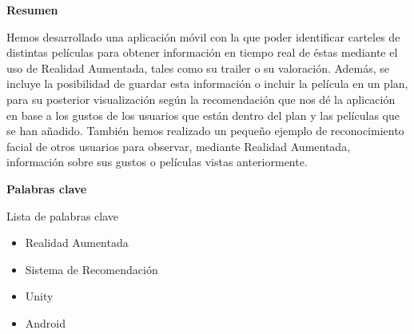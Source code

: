 
\newpage

\thispagestyle{empty}

\begin{center}

{\bf \Huge Resumen}

  \end{center}
\vspace{1cm}

Hemos desarrollado una aplicación móvil con la que poder identificar
carteles de distintas películas para obtener información en tiempo real de
éstas mediante el uso de Realidad Aumentada, tales como su trailer o su valoración. Además,
se incluye la posibilidad de guardar esta información o incluir la película en un plan, para 
su posterior visualización según la recomendación que nos dé la aplicación en base a 
los gustos de los usuarios que están dentro del plan y las películas que se han añadido. 
También hemos realizado un pequeño ejemplo de reconocimiento facial de otros usuarios para observar, 
mediante Realidad Aumentada, información sobre sus gustos o películas vistas anteriormente.

\vspace{1cm}


\begin{center}

{\bf \Large Palabras clave}

   \end{center}

   \vspace{0.5cm}
   
   Lista de palabras clave
   \begin{itemize}  
    \item Realidad Aumentada
    \item Sistema de Recomendación
    \item Unity
    \item Android
  \end{itemize}
   


